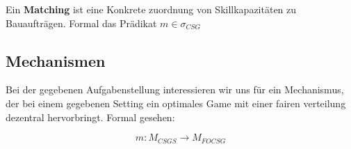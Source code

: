 \begin{definition}[Matching]
  Ein \textbf{Matching} ist eine Konkrete zuordnung von Skillkapazitäten zu Bauaufträgen.
  Formal das Prädikat $m\in\sigma_{CSG}$
\end{definition}



\subsection{Mechanismen}

Bei der gegebenen Aufgabenstellung interessieren wir uns für ein Mechanismus, der bei einem gegebenen Setting ein optimales Game mit einer fairen verteilung dezentral hervorbringt. Formal gesehen:

\begin{equation}
  m: M_{CSGS} \rightarrow M_{FOCSG}
\end{equation}
